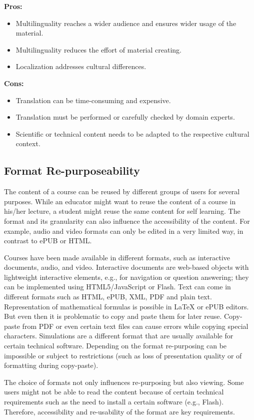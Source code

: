 \documentclass{sig-alternate}
\theoremstyle{definition}
\begin{document}
\noindent\textbf{Pros:}
\begin{itemize}
\item Multilinguality reaches a wider audience and ensures wider usage of the material.
\item Multilinguality reduces the effort of material creating.
\item Localization addresses cultural differences.
\end{itemize}
\noindent\textbf{Cons:}
\begin{itemize}
\item Translation can be time-consuming and expensive.
\item Translation must be performed or carefully checked by domain experts.
\item Scientific or technical content needs to be adapted to the respective cultural context.
\end{itemize}

\subsection{Format Re-purposeability}
\label{sec:Format}
The content of a course can be reused by different groups of users for several purposes.
While an educator might want to reuse the content of a course in his/her lecture, a student might reuse the same content for self learning.
The format and its granularity can also influence the accessibility of the content.
For example, audio and video formats can only be edited in a very limited way, in contrast to ePUB or HTML.

Courses have been made available in different formats, such as interactive documents, audio, and video.
Interactive documents are web-based objects with lightweight interactive elements, e.g., for navigation or question answering; they can be implemented using HTML5/JavaScript or Flash.
Text can come in different formats such as HTML, ePUB, XML, PDF and plain text.
Representation of mathematical formulas is possible in \LaTeX{} or ePUB editors.
But even then it is problematic to copy and paste them for later reuse.
Copy-paste from PDF or even certain text files can cause errors while copying special characters.
Simulations are a different format that are usually available for certain technical software.
Depending on the format re-purposing can be impossible or subject to restrictions (such as loss of presentation quality or of formatting during copy-paste).

The choice of formats not only influences re-purposing but also viewing.
Some users might not be able to read the content because of certain technical requirements such as the need to install a certain software (e.g., Flash).
Therefore, accessibility and re-usability of the format are key requirements.
\end{document}
